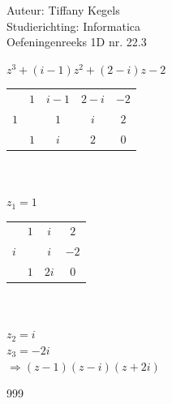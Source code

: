 \documentclass[a4paper]{article}
\begin{document}
  
\noindent \large Auteur: Tiffany Kegels \\
\noindent \large Studierichting: Informatica\\
\noindent \large Oefeningenreeks 1D nr. 22.3\\

\medskip

\normalsize

$z^3 + (i-1)z^2 + (2-i)z - 2$\\

\begin{tabular}{c|cccc}
    & $1$ & $i-1$ & $2-i$ & $-2$\\
$1$ &     & $1$  & $i$  & $2$\\ \hline
    & $1$ & $i$  & $2$  & \vline $0$ \\
\end{tabular}\\\\

$z_1 = 1$\\

\begin{tabular}{c|ccc}
    & $1$ & $i$  & $2$\\
$i$ &     & $i$ & $-2$\\ \hline
    & $1$ & $2i$ & \vline $0$ \\
\end{tabular}\\\\

$z_2 = i$\\

$z_3 = -2i$\\

$\Rightarrow (z-1)(z-i)(z+2i)$\\

\begin{thebibliography}{999}

\end{thebibliography}
\end{document}
